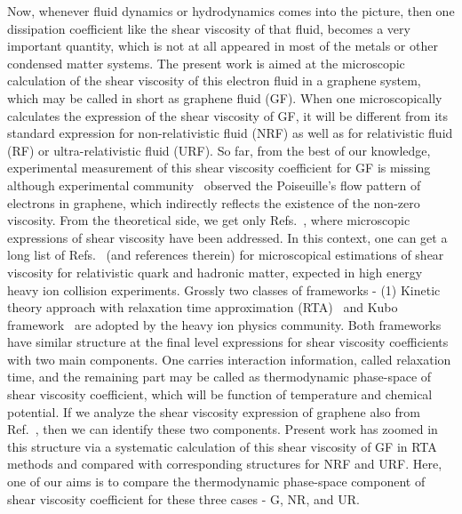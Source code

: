 \documentclass[amsmath,amssymb,aps,prb]{revtex4-2}
\begin{document}
%
    Now, whenever fluid dynamics or hydrodynamics comes into the picture, then one dissipation coefficient like the shear viscosity of that fluid, becomes a very important quantity, which is not at all appeared in most of the metals or other condensed matter systems. The present work is aimed at the microscopic calculation of the shear viscosity of this electron fluid in a graphene system, which may be called in short as graphene fluid (GF). When one microscopically calculates the expression of the shear viscosity of GF, it will be different from its standard expression for non-relativistic fluid (NRF) as well as for relativistic fluid (RF) or ultra-relativistic fluid (URF).    
%
    So far, from the best of our knowledge, experimental measurement of this shear viscosity coefficient for GF is missing although experimental community~\cite{1Ku:2019lgj,9sulpizio2019visualizing} observed the Poiseuille's flow pattern of electrons in graphene, which indirectly reflects the existence of the non-zero viscosity. From the theoretical side, we get only Refs.~\cite{24PhysRevLett.103.025301, Vignale}, where microscopic expressions of shear viscosity have been addressed. In this context, one can get a long list of Refs.~\cite{QGP1, QGP2, QGP3, QGP4, QGP5, QGP6, QGP7, QGP8, QGP9, QGP10} (and references therein) for microscopical estimations of shear viscosity for relativistic quark and hadronic matter, expected in high energy heavy ion collision experiments. Grossly two classes of frameworks - (1) Kinetic theory approach with relaxation time approximation (RTA)~\cite{QGP1, QGP2, QGP3, QGP4, QGP5, QGP6, QGP7} and Kubo framework~\cite{QGP8, QGP9, QGP10} are adopted by the heavy ion physics community. Both frameworks have similar structure at the final level expressions for shear viscosity coefficients with two main components. One carries interaction information, called relaxation time, and the remaining part may be called as thermodynamic phase-space of shear viscosity coefficient, which will be function of temperature and chemical potential. If we analyze the shear viscosity expression of graphene also from Ref.~\cite{24PhysRevLett.103.025301}, then we can identify these two components. Present work has zoomed in this structure via a systematic calculation of this shear viscosity of GF in RTA methods and compared with corresponding structures for NRF and URF. Here, one of our aims is to compare the thermodynamic phase-space component of shear viscosity coefficient for these three cases - G, NR, and UR.  
%
\end{document}
